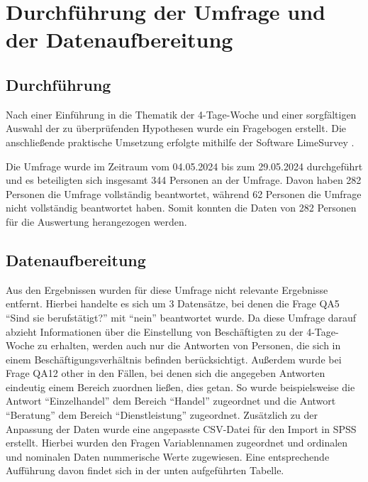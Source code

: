 \chapter{Durchführung der Umfrage und der Datenaufbereitung}


 
\section{Durchführung}

Nach einer Einführung in die Thematik der 4-Tage-Woche und einer sorgfältigen Auswahl der zu 
überprüfenden Hypothesen wurde ein Fragebogen erstellt.
Die anschließende praktische Umsetzung erfolgte mithilfe der Software LimeSurvey 
\parencite[vgl.][]{limesurvey_gmbh_limesurvey_nodate}.

Die Umfrage wurde im Zeitraum vom 04.05.2024 bis zum 29.05.2024 durchgeführt und es beteiligten sich
insgesamt 344 Personen an der Umfrage. Davon haben 282 Personen die Umfrage vollständig beantwortet,
während 62 Personen die Umfrage nicht vollständig beantwortet haben. Somit konnten die Daten von 282 Personen für die Auswertung herangezogen werden.

\section{Datenaufbereitung}
Aus den Ergebnissen wurden für diese Umfrage nicht relevante Ergebnisse entfernt. 
Hierbei handelte es sich um 3 Datensätze, bei denen die Frage QA5 “Sind sie berufstätigt?” 
mit “nein” beantwortet wurde. Da diese Umfrage darauf abzieht Informationen über die 
Einstellung von Beschäftigten zu der 4-Tage-Woche zu erhalten, werden auch nur die 
Antworten von Personen, die sich in einem Beschäftigungsverhältnis befinden berücksichtigt. 
Außerdem wurde bei Frage QA12 other in den Fällen, bei denen sich die angegeben Antworten 
eindeutig einem Bereich zuordnen ließen, dies getan. So wurde beispielsweise die Antwort 
“Einzelhandel” dem Bereich “Handel” zugeordnet und die Antwort “Beratung” dem Bereich 
“Dienstleistung” zugeordnet.  
Zusätzlich zu der Anpassung der Daten wurde eine angepasste CSV-Datei für den Import 
in SPSS erstellt. Hierbei wurden den Fragen Variablennamen zugeordnet und ordinalen 
und nominalen Daten nummerische Werte zugewiesen. Eine entsprechende Aufführung davon 
findet sich in der unten aufgeführten Tabelle. 
